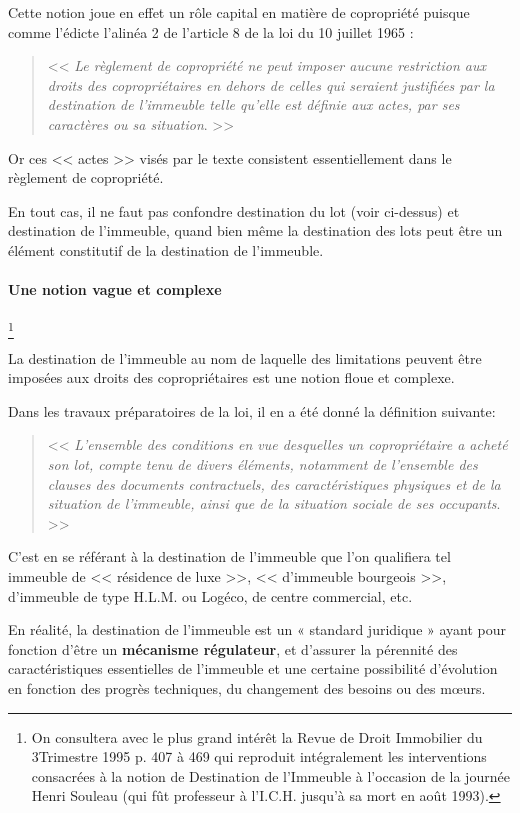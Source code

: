 			Cette notion joue en effet un rôle capital en matière de copropriété puisque comme l'édicte l'alinéa 2 de l'article 8 de la loi du 10 juillet 1965 :
			\begin{quote}
				<< {\itshape Le règlement de copropriété ne peut imposer aucune restriction aux droits des copropriétaires en dehors de celles qui seraient justifiées par la destination de l'immeuble telle qu'elle est définie aux actes, par ses caractères ou sa situation}. >>
			\end{quote}

			Or ces << actes >> visés par le texte consistent essentiellement dans le règlement de copropriété.
			
			En tout cas, il ne faut pas confondre destination du lot (voir ci-dessus) et destination de l’immeuble, quand bien même la destination des lots peut être un élément constitutif de la destination de l’immeuble.
			
			\paragraph{Une notion vague et complexe}\footnote{On consultera avec le plus grand intérêt la Revue de Droit Immobilier du 3\degres Trimestre 1995 p. 407 à 469 qui reproduit intégralement les interventions consacrées à la notion de Destination de l'Immeuble à l'occasion de la journée Henri Souleau (qui fût professeur à l'I.C.H. jusqu'à sa mort en août 1993).}
			
				La destination de l'immeuble au nom de laquelle des limitations peuvent être imposées aux droits des copropriétaires est une notion floue et complexe.
				
				Dans les travaux préparatoires de la loi, il en a été donné la définition suivante:
				\begin{quote}
					<< {\itshape L'ensemble des conditions en vue desquelles un copropriétaire a acheté son lot, compte tenu de divers éléments, notamment de l'ensemble des clauses des documents contractuels, des caractéristiques physiques et de la situation de l'immeuble, ainsi que de la situation sociale de ses occupants}. >>
				\end{quote}
			
				C'est en se référant à la destination de l'immeuble que l'on qualifiera tel immeuble de << résidence de luxe >>, << d'immeuble bourgeois >>, d'immeuble de type H.L.M. ou Logéco, de centre commercial, etc.
				
				En réalité, la destination de l’immeuble est un « standard juridique » ayant pour fonction d’être un \textbf{mécanisme régulateur}, et d'assurer la pérennité des caractéristiques essentielles de l'immeuble et une certaine possibilité d'évolution en fonction des progrès techniques, du changement des besoins ou des mœurs.
				
